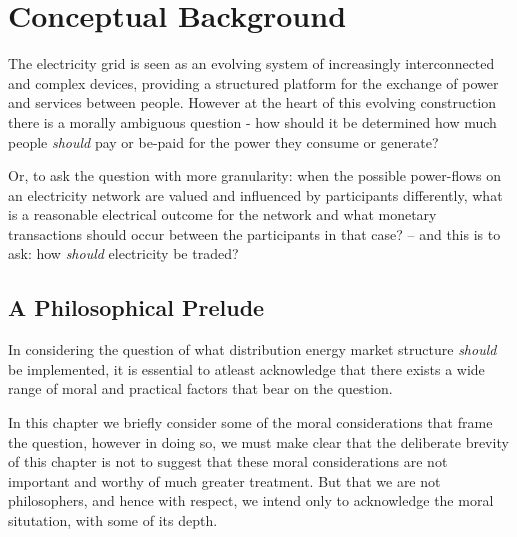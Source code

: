 \chapter{Conceptual Background}
\label{cha:background}

The electricity grid is seen as an evolving system of increasingly interconnected and complex devices, providing a structured platform for the exchange of power and services between people.
However at the heart of this evolving construction there is a morally ambiguous question - how should it be determined how much people \textit{should} pay or be-paid for the power they consume or generate?

Or, to ask the question with more granularity: when the possible power-flows on an electricity network are valued and influenced by participants differently, 
what is a reasonable electrical outcome for the network and what monetary transactions should occur between the participants in that case? -- and this is to ask: how \textit{should} electricity be traded?\\


\section{A Philosophical Prelude}


In considering the question of what distribution energy market structure \textit{should} be implemented, it is essential to atleast acknowledge that there exists a wide range of moral and practical factors that bear on the question.

In this chapter we briefly consider some of the moral considerations that frame the question, however in doing so, we must make clear that the deliberate brevity of this chapter is not to suggest that these moral considerations are not important and worthy of much greater treatment. But that we are not philosophers, and hence with respect, we intend only to acknowledge the moral situtation, with some of its depth.

